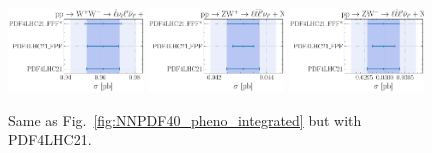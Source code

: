 \begin{figure}[t]
	\includegraphics[width=0.32\textwidth]{plots/LHCpheno/NNPDF_WPWM_14TEV_40_PHENO-integrated-pdf4lhc21.pdf}
	\includegraphics[width=0.32\textwidth]{plots/LHCpheno/NNPDF_WPZ_14TEV_40_PHENO-integrated-pdf4lhc21.pdf}
	\includegraphics[width=0.32\textwidth]{plots/LHCpheno/NNPDF_WMZ_14TEV_40_PHENO-integrated-pdf4lhc21.pdf}
	\caption{
		Same as Fig.~\ref{fig:NNPDF40_pheno_integrated} but with PDF4LHC21.
		}
	\label{fig:PDF4LHC21_pheno_integrated}
\end{figure}

